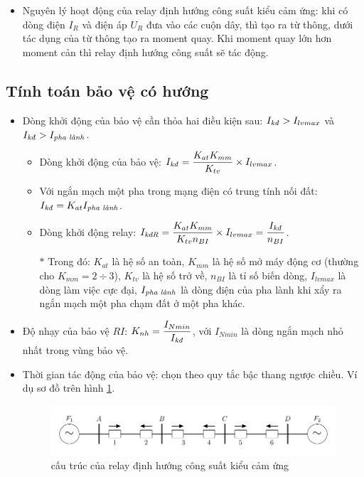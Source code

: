 \documentclass[12pt,a4paper]{article}
\begin{document}
\begin{itemize}
		\item Nguyên lý hoạt động của relay định hướng công suất kiểu cảm ứng: khi có dòng điện $I_R$ và điện áp $U_R$ đưa vào các cuộn dây, thì tạo ra từ thông, dưới tác dụng của từ thông tạo ra moment quay. Khi moment quay lớn hơn moment cản thì relay định hướng công suất sẽ tác động.
	\end{itemize}
	
\subsection{Tính toán bảo vệ có hướng}
	\begin{itemize}
		\item Dòng khởi động của bảo vệ cần thỏa hai điều kiện sau: $I_{\text{\textit{kđ}}} > I_{lvmax}$ và $I_{\text{\textit{kđ}}} > I_{\text{\textit{pha lành}}}$.
			\begin{itemize}
				\item Dòng khởi động của bảo vệ: $I_{\text{\textit{kđ}}} = \dfrac{K_{at} K_{mm}}{K_{tv}} \times I_{lvmax}$.
				
				\item Với ngắn mạch một pha trong mạng điện có trung tính nối đất: $I_{\text{\textit{kđ}}} = K_{at}I_{\text{\textit{pha lành}}}$.								
				
				\item Dòng khởi động relay: $I_{\text{\textit{kđR}}} = \dfrac{K_{at} K_{mm}}{K_{tv} n_{BI}} \times I_{lvmax} = \dfrac{I_{\text{\textit{kđ}}}}{n_{BI}}$.
				
				\item[$\ast$] Trong đó: $K_{at}$ là hệ số an toàn, $K_{mm}$ là hệ số mở máy động cơ (thường cho $K_{mm} = 2 \div 3$), $K_{tv}$ là hệ số trở về, $n_{BI}$ là tỉ số biến dòng, $I_{lvmax}$ là dòng làm việc cực đại, $I_{\text{\textit{pha lành}}}$ là dòng điện của pha lành khi xẩy ra ngắn mạch một pha chạm đất ở một pha khác.	
			\end{itemize}				

		\item Độ nhạy của bảo vệ $RI$: $K_{nh} = \dfrac{I_{Nmin}}{I_{\text{\textit{kđ}}}}$, với $I_{Nmin}$ là dòng ngắn mạch nhỏ nhất trong vùng bảo vệ.
		
		\item Thời gian tác động của bảo vệ: chọn theo quy tắc bậc thang ngược chiều. Ví dụ sơ đồ trên hình \ref{Fig:sodo-baove-dongdiencohuong}.
		
			\begin{figure}[!h]
				\begin{center}					
					\includegraphics[scale=1]{diagram-draw-tikz/Figure-sodo-baove-dongdiencohuong.pdf} 
				\end{center}
				\caption{cấu trúc của relay định hướng công suất kiểu cảm ứng} \label{Fig:sodo-baove-dongdiencohuong}
			\end{figure}
	

\end{itemize}
\end{document}
